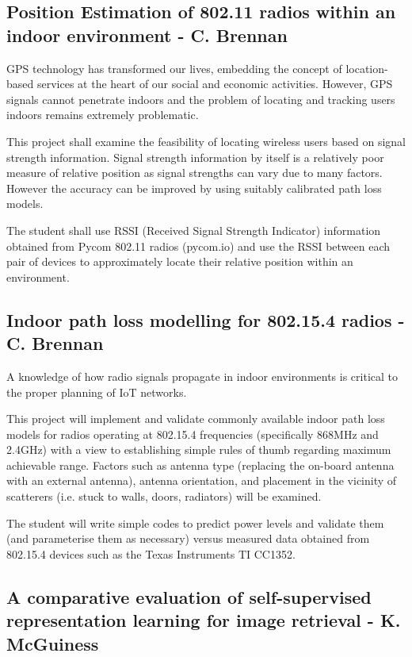 \documentclass[a4paper]{article}
\begin{document}
\subsection{Position Estimation of 802.11 radios within an indoor environment -
C. Brennan}

GPS technology has transformed our lives, embedding the concept of location-based services at the heart of our social and economic activities. However, GPS signals cannot penetrate indoors and the problem of locating and tracking users indoors remains extremely problematic.

This project shall examine the feasibility of locating wireless users based on signal strength information. Signal strength information by itself is a relatively poor measure of relative position as signal strengths can vary due to many factors. However the accuracy can be improved by using suitably calibrated path loss models.

The student shall use RSSI (Received Signal Strength Indicator) information obtained from Pycom 802.11 radios (pycom.io) and use the RSSI between each pair of devices to approximately locate their relative position within an environment.

\subsection{Indoor path loss modelling for 802.15.4 radios - C. Brennan}

    A knowledge of how radio signals propagate in indoor environments is critical to the proper planning of IoT networks.

    This project will implement and validate commonly available indoor path loss models for radios operating at 802.15.4 frequencies (specifically 868MHz and 2.4GHz) with a view to establishing simple rules of thumb regarding maximum achievable range. Factors such as antenna type (replacing the on-board antenna with an external antenna), antenna orientation, and placement in the vicinity of scatterers (i.e. stuck to walls, doors, radiators) will be examined.

    The student will write simple codes to predict power levels and validate them (and parameterise them as necessary) versus measured data obtained from 802.15.4 devices such as the Texas Instruments TI CC1352.

\subsection{A comparative evaluation of self-supervised representation learning
for image retrieval - K. McGuiness}
\end{document}
